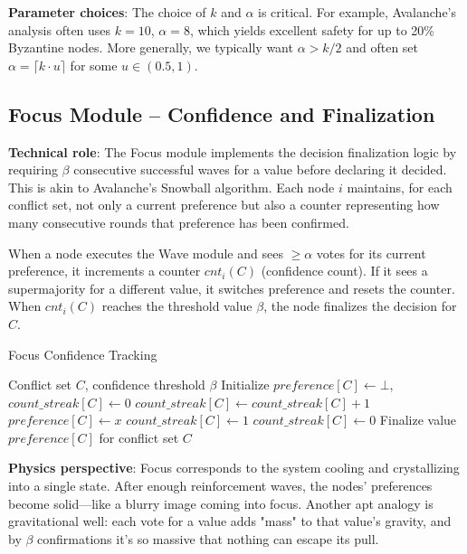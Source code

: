 \textbf{Parameter choices}: The choice of $k$ and $\alpha$ is critical. For example, Avalanche's analysis often uses $k=10$, $\alpha=8$, which yields excellent safety for up to 20\% Byzantine nodes. More generally, we typically want $\alpha > k/2$ and often set $\alpha = \lceil k \cdot u \rceil$ for some $u \in (0.5,1)$.

\subsection{Focus Module – Confidence and Finalization}

\textbf{Technical role}: The Focus module implements the decision finalization logic by requiring $\beta$ consecutive successful waves for a value before declaring it decided. This is akin to Avalanche's Snowball algorithm. Each node $i$ maintains, for each conflict set, not only a current preference but also a counter representing how many consecutive rounds that preference has been confirmed.

When a node executes the Wave module and sees $\ge \alpha$ votes for its current preference, it increments a counter $cnt_i(C)$ (confidence count). If it sees a supermajority for a different value, it switches preference and resets the counter. When $cnt_i(C)$ reaches the threshold value $\beta$, the node finalizes the decision for $C$.

\begin{algorithm}
\caption{Focus Confidence Tracking}
\begin{algorithmic}[1]
\REQUIRE Conflict set $C$, confidence threshold $\beta$
\STATE Initialize $preference[C] \leftarrow \bot$, $count\_streak[C] \leftarrow 0$
    \STATE $count\_streak[C] \leftarrow count\_streak[C] + 1$
    \STATE $preference[C] \leftarrow x$
    \STATE $count\_streak[C] \leftarrow 1$
\ELSE
    \STATE $count\_streak[C] \leftarrow 0$ 
\ENDIF
{}
    \STATE Finalize value $preference[C]$ for conflict set $C$
\ENDIF
\end{algorithmic}
\end{algorithm}

\textbf{Physics perspective}: Focus corresponds to the system cooling and crystallizing into a single state. After enough reinforcement waves, the nodes' preferences become solid—like a blurry image coming into focus. Another apt analogy is gravitational well: each vote for a value adds "mass" to that value's gravity, and by $\beta$ confirmations it's so massive that nothing can escape its pull.

